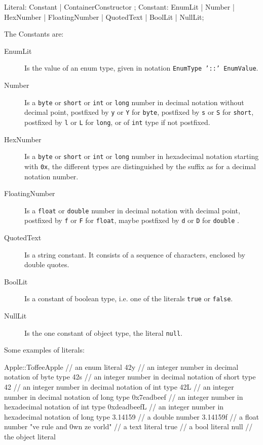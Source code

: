 \begin{rail}
  Literal: Constant | ContainerConstructor ;
  Constant: EnumLit | Number | HexNumber | FloatingNumber | QuotedText | BoolLit | NullLit;
\end{rail}\label{literaldef}


The Constants are:
\begin{description}
  \item[EnumLit] Is the value of an enum type, given in notation \texttt{EnumType '::' EnumValue}.
  \item[Number] Is a \texttt{byte} or \texttt{short} or \texttt{int} or \texttt{long} number in decimal notation without decimal point, postfixed by \texttt{y} or \texttt{Y} for \texttt{byte}, postfixed by \texttt{s} or \texttt{S} for \texttt{short}, postfixed by \texttt{l} or \texttt{L} for \texttt{long}, or of \texttt{int} type if not postfixed.
  \item[HexNumber] Is a \texttt{byte} or \texttt{short} or \texttt{int} or \texttt{long} number in hexadecimal notation starting with \texttt{0x}, the different types are distinguished by the suffix as for a decimal notation number.
  \item[FloatingNumber] Is a \texttt{float} or \texttt{double} number in decimal notation with decimal point, postfixed by \texttt{f} or \texttt{F} for \texttt{float}, maybe postfixed by \texttt{d} or \texttt{D} for \texttt{double} .
  \item[QuotedText] Is a string constant. It consists of a sequence of characters, enclosed by double quotes.
  \item[BoolLit] Is a constant of boolean type, i.e. one of the literals \texttt{true} or \texttt{false}.
  \item[NullLit] Is the one constant of object type, the literal \texttt{null}.
\end{description}

\begin{example}
Some examples of literals:
\begin{grgen}
Apple::ToffeeApple // an enum literal
42y // an integer number in decimal notation of byte type
42s // an integer number in decimal notation of short type
42 // an integer number in decimal notation of int type
42L // an integer number in decimal notation of long type
0x7eadbeef // an integer number in hexadecimal notation of int type
0xdeadbeefL // an integer number in hexadecimal notation of long type
3.14159 // a double number
3.14159f // a float number
"ve rule and 0wn ze vorld" // a text literal
true // a bool literal
null // the object literal
\end{grgen}
\end{example}

